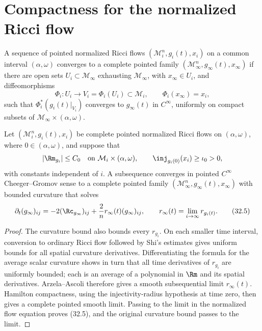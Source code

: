 \section{Compactness for the normalized Ricci flow}

\begin{definition}
\label{def:chow-iv-pointed-cheeger-gromov-convergence-nrf}
A sequence of pointed normalized Ricci flows
$(\mathcal M_i^n,g_i(t),x_i)$ on a common interval $(\alpha,\omega)$
converges to a complete pointed family
$(\mathcal M_\infty^n,g_\infty(t),x_\infty)$ if there are open sets
$U_i\subset\mathcal M_\infty$ exhausting $\mathcal M_\infty$, with
$x_\infty\in U_i$, and diffeomorphisms
\[
 \Phi_i:U_i\longrightarrow V_i=\Phi_i(U_i)\subset\mathcal M_i,
 \qquad \Phi_i(x_\infty)=x_i,
\]
such that $\Phi_i^*(g_i(t)|_{V_i})$ converges to $g_\infty(t)$ in
$C^\infty$, uniformly on compact subsets of
$\mathcal M_\infty\times(\alpha,\omega)$.
\end{definition}

\begin{theorem}
\label{thm:chow-iv-hamilton-compactness-nrf}
Let $(\mathcal M_i^n,g_i(t),x_i)$ be complete pointed normalized Ricci
flows on $(\alpha,\omega)$, where $0\in(\alpha,\omega)$, and suppose that
\[
 |\Rm_{g_i}|\le C_0
 \quad\text{on }\mathcal M_i\times(\alpha,\omega),
 \qquad
 \inj_{g_i(0)}(x_i)\ge\iota_0>0,
\]
with constants independent of $i$.  A subsequence converges in pointed
$C^\infty$ Cheeger--Gromov sense to a complete pointed family
$(\mathcal M_\infty^n,g_\infty(t),x_\infty)$ with bounded curvature that
solves
\begin{equation*}
 \partial_t(g_\infty)_{ij}
 =-2(\Rc_{g_\infty})_{ij}+\frac2n r_\infty(t)(g_\infty)_{ij},
 \qquad
 r_\infty(t)=\lim_{i\to\infty}r_{g_i(t)}.
 \tag{32.5}
\end{equation*}
\end{theorem}
\begin{proof}
\sketch
The curvature bound also bounds every $r_{g_i}$.  On each smaller time
interval, conversion to ordinary Ricci flow followed by Shi's estimates
gives uniform bounds for all spatial curvature derivatives.  Differentiating
the formula for the average scalar curvature shows in turn that all time
derivatives of $r_{g_i}$ are uniformly bounded; each is an average of a
polynomial in $\Rm$ and its spatial derivatives.  Arzela--Ascoli therefore
gives a smooth subsequential limit $r_\infty(t)$.  Hamilton compactness,
using the injectivity-radius hypothesis at time zero, then gives a complete
pointed smooth limit.  Passing to the limit in the normalized flow equation
proves (32.5), and the original curvature bound passes to the limit.
\end{proof}

